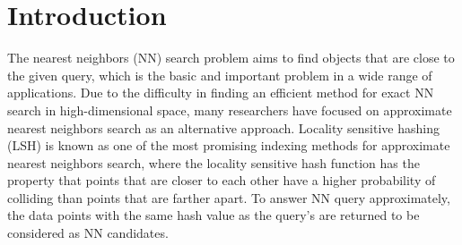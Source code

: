 \section{Introduction}
\label{sec:intro}


The nearest neighbors (NN) search problem aims to find objects that are close to the given query, which is the basic and important problem in a wide range of applications. Due to the difficulty in finding an efficient method for exact NN search in high-dimensional space, many researchers have focused on approximate nearest neighbors search as an alternative approach. Locality sensitive hashing (LSH) \cite{orilsh} is known as one of the most promising indexing methods for approximate nearest neighbors search, where the locality sensitive hash function has the property that points that are closer to each other have a higher probability of colliding than points that are farther apart. To answer NN query approximately, the data points with the same hash value as the query's are returned to be considered as NN candidates.

